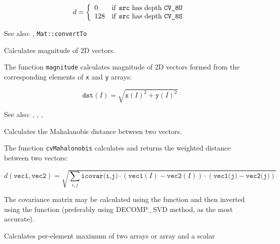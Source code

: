 \[
d = \left\{ \begin{array}{l l} 0 & \mbox{if \texttt{src} has depth \texttt{CV\_8U}}\\ 128 & \mbox{if \texttt{src} has depth \texttt{CV\_8S}}\\ \end{array} \right.
\]

See also: , \texttt{Mat::convertTo}

Calculates magnitude of 2D vectors.

\begin{description}
\end{description}

The function \texttt{magnitude} calculates magnitude of 2D vectors formed from the corresponding elements of \texttt{x} and \texttt{y} arrays:

\[
\texttt{dst}(I) = \sqrt{\texttt{x}(I)^2 + \texttt{y}(I)^2}
\]

See also: , , , 


Calculates the Mahalanobis distance between two vectors.

\begin{description}
\end{description}

The function \texttt{cvMahalonobis} calculates and returns the weighted distance between two vectors:

\[
d(\texttt{vec1},\texttt{vec2})=\sqrt{\sum_{i,j}{\texttt{icovar(i,j)}\cdot(\texttt{vec1}(I)-\texttt{vec2}(I))\cdot(\texttt{vec1(j)}-\texttt{vec2(j)})}}
\]

The covariance matrix may be calculated using the  function and then inverted using the  function (preferably using DECOMP\_SVD method, as the most accurate).


Calculates per-element maximum of two arrays or array and a scalar

